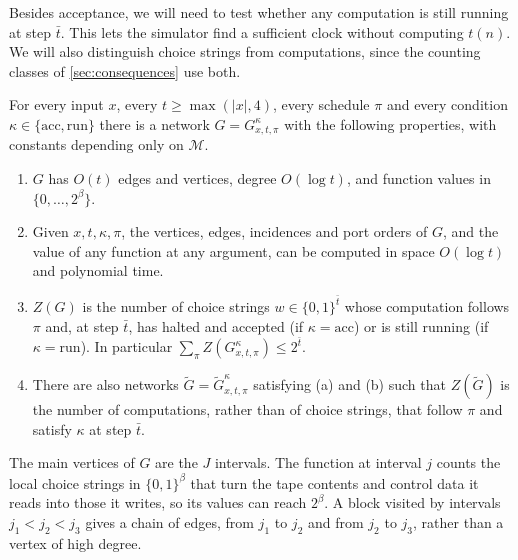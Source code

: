 \documentclass[11pt]{article}
\theoremstyle{definition}
\theoremstyle{definition}
\theoremstyle{remark}
\newcommand{\acc}{\mathrm{acc}}
\newcommand{\run}{\mathrm{run}}
\begin{document}
Besides acceptance, we will need to test whether any computation is still running at step $\bar t$. This lets the simulator find a sufficient clock without computing $t(n)$. We will also distinguish choice strings from computations, since the counting classes of \cref{sec:consequences} use both.

\begin{lemma}\label{lem:block}
For every input $x$, every $t\ge\max(|x|,4)$, every schedule $\pi$ and every condition $\kappa\in\{\acc,\run\}$ there is a network $G=G^\kappa_{x,t,\pi}$ with the following properties, with constants depending only on $\mathcal M$.
\begin{enumerate}[label=(\alph*)]
\item $G$ has $O(t)$ edges and vertices, degree $O(\log t)$, and function values in $\{0,\dots,2^\beta\}$.
\item Given $x,t,\kappa,\pi$, the vertices, edges, incidences and port orders of $G$, and the value of any function at any argument, can be computed in space $O(\log t)$ and polynomial time.
\item $Z(G)$ is the number of choice strings $w\in\{0,1\}^{\bar t}$ whose computation follows $\pi$ and, at step $\bar t$, has halted and accepted (if $\kappa=\acc$) or is still running (if $\kappa=\run$). In particular $\sum_\pi Z(G^\kappa_{x,t,\pi})\le 2^{\bar t}$.
\item There are also networks $\tilde G=\tilde G^\kappa_{x,t,\pi}$ satisfying (a) and (b) such that $Z(\tilde G)$ is the number of computations, rather than of choice strings, that follow $\pi$ and satisfy $\kappa$ at step $\bar t$.
\end{enumerate}
\end{lemma}

The main vertices of $G$ are the $J$ intervals. The function at interval $j$ counts the local choice strings in $\{0,1\}^\beta$ that turn the tape contents and control data it reads into those it writes, so its values can reach $2^\beta$. A block visited by intervals $j_1<j_2<j_3$ gives a chain of edges, from $j_1$ to $j_2$ and from $j_2$ to $j_3$, rather than a vertex of high degree.
\end{document}
